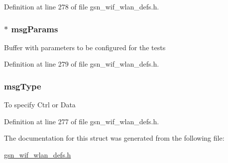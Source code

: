 Definition at line 278 of file gsn\_\-wif\_\-wlan\_\-defs.h.

\hypertarget{a00418_ae04d54b2c5f3d01b691a7b1ae037667e}{
\subsubsection[{msgParams}]{$\ast$ {\bf msgParams}}}
\label{a00418_ae04d54b2c5f3d01b691a7b1ae037667e}
Buffer with parameters to be configured for the tests 

Definition at line 279 of file gsn\_\-wif\_\-wlan\_\-defs.h.

\hypertarget{a00418_a99d30a827a47c76290ea00f3938e3521}{
\subsubsection[{msgType}]{ {\bf msgType}}}
\label{a00418_a99d30a827a47c76290ea00f3938e3521}
To specify Ctrl or Data 

Definition at line 277 of file gsn\_\-wif\_\-wlan\_\-defs.h.



The documentation for this struct was generated from the following file:\begin{DoxyCompactItemize}
\item 
\hyperlink{a00613}{gsn\_\-wif\_\-wlan\_\-defs.h}\end{DoxyCompactItemize}
